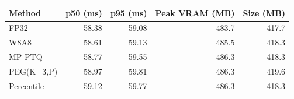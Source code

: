 \begin{tabular}{lrrrr}
\toprule
Method & p50 (ms) & p95 (ms) & Peak VRAM (MB) & Size (MB)\\
\midrule
FP32 & 58.38 & 59.08 & 483.7 & 417.7\\
W8A8 & 58.61 & 59.13 & 485.5 & 418.3\\
MP-PTQ & 58.77 & 59.55 & 486.3 & 418.3\\
PEG(K=3,P) & 58.97 & 59.81 & 486.3 & 419.6\\
Percentile & 59.12 & 59.77 & 486.3 & 418.3\\
\bottomrule
\end{tabular}
